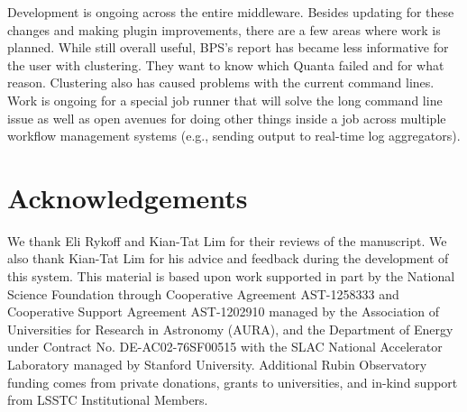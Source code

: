 \documentclass[11pt,twoside]{article}
\begin{document}
Development is ongoing across the entire middleware.  Besides updating for
these changes and making plugin improvements, there are a few areas where
work is planned.  While still overall useful, BPS's report has became less
informative for the user with clustering.  They want to know which Quanta
failed and for what reason.  Clustering also has caused problems with
the current command lines.  Work is ongoing for a special job runner that
will solve the long command line issue as well as open avenues for doing
other things inside a job across multiple workflow management systems
(e.g., sending output to real-time log aggregators).

\section*{Acknowledgements}
We thank Eli Rykoff and Kian-Tat Lim for their reviews of the
manuscript. We also thank Kian-Tat Lim for his advice and feedback
during the development of this system.  This material is based upon work
supported in part by the National Science Foundation through Cooperative
Agreement AST-1258333 and Cooperative Support Agreement AST-1202910
managed by the Association of Universities for Research in Astronomy
(AURA), and the Department of Energy under Contract No. DE-AC02-76SF00515
with the SLAC National Accelerator Laboratory managed by Stanford
University. Additional Rubin Observatory funding comes from private
donations, grants to universities, and in-kind support from LSSTC
Institutional Members.





\end{document}

